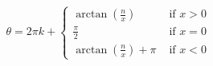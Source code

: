 \documentclass[preview]{standalone}
\begin{document}
\begin{align*}
\frac{}{}\theta=2\pi k + \begin{cases}\arctan\left ( \frac{n}{x} \right ) & \text{ if } x> 0 \\ \frac{\pi }{2} & \text{ if } x=0 \\ \arctan\left ( \frac{n}{x} \right )+\pi & \text{ if } x< 0 \end{cases}
\end{align*}
\end{document}
